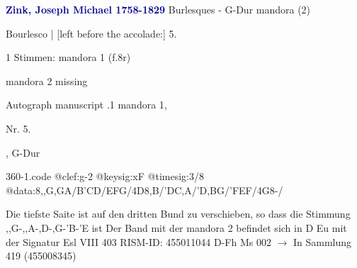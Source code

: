\documentclass[twocolumn]{book}
\begin{document}
\newline \par \vspace{7pt} \textcolor{darkblue}{\textbf{Zink, Joseph Michael  1758-1829}}
\newline Burlesques - G-Dur
\newline mandora (2)
\newline \begin{itshape}[f.8r, at left:] Bourlesco | [left before the accolade:] 5.\end{itshape} 
\newline \textcolor{darkblue}{}  1 Stimmen: mandora 1  (f.8r)
\newline \begin{small} mandora 2 missing\end{small} 
\newline Autograph manuscript
.1  mandora 1, \begin{itshape}Nr. 5.\end{itshape}, G-Dur  
\begin{filecontents*}{360-1.code}
@clef:g-2
@keysig:xF
@timesig:3/8
@data:8,,G,GA/B'CD/EFG/4D8,B/'DC,A/'D,BG/'FEF/4G8-/
\end{filecontents*}
\newline
%
\newline Die tiefste Saite ist auf den dritten Bund zu verschieben, so dass die Stimmung ,,G-,,A-,D-,G-'B-'E ist
\newline Der Band mit der mandora 2 befindet sich in D Eu mit der Signatur Esl VIII 403
\newline RISM-ID: 455011044
\newline D-Fh  Ms 002
\newline $\rightarrow$ In Sammlung 419 (455008345)
      
\end{document}

